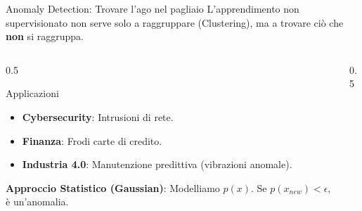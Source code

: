 \documentclass[aspectratio=169, 10pt]{beamer}
\begin{document}
\begin{frame}{Anomaly Detection: Trovare l'ago nel pagliaio}
    L'apprendimento non supervisionato non serve solo a raggruppare (Clustering), ma a trovare ciò che \textbf{non} si raggruppa.
    
    \begin{columns}[T]
        \begin{column}{0.5\textwidth}
            \begin{block}{Applicazioni}
                \begin{itemize}
                    \item \textbf{Cybersecurity}: Intrusioni di rete.
                    \item \textbf{Finanza}: Frodi carte di credito.
                    \item \textbf{Industria 4.0}: Manutenzione predittiva (vibrazioni anomale).
                \end{itemize}
            \end{block}
            \small
            \textbf{Approccio Statistico (Gaussian)}:
            Modelliamo $p(x)$. Se $p(x_{new}) < \epsilon$, è un'anomalia.
        \end{column}
        \begin{column}{0.5\textwidth}
            \centering
        \end{column}
    \end{columns}
\end{frame}
\end{document}
